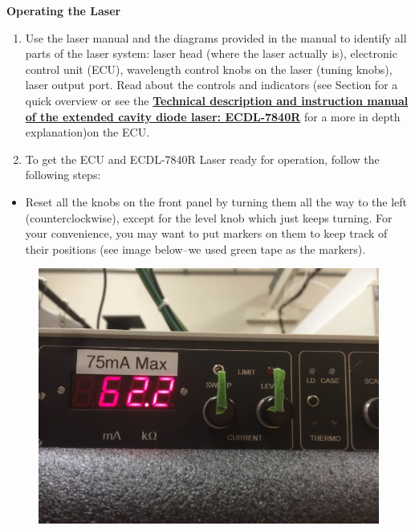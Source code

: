 \documentclass{../lab}
\begin{document}
\textbf{Operating the Laser}\begin{enumerate}
    \item Use the laser manual and the diagrams provided in the manual to identify all parts of the laser system: laser head (where the laser actually is), electronic control unit (ECU), wavelength control knobs on the laser (tuning knobs), laser output port. Read about the controls and indicators (see Section  for a quick overview or see the \href{http://physics111.lib.berkeley.edu/Physics111/Equipment\_Manuals/manual\_D1\_ECDL\_laser.pdf}{\textbf{Technical description and instruction manual of the extended cavity diode laser: ECDL-7840R}} for a more in depth explanation)on the ECU.

    \item To get the ECU and ECDL-7840R Laser ready for operation, follow the following steps:

\end{enumerate}

\begin{itemize}
    \item Reset all the knobs on the front panel by turning them all the way to the left (counterclockwise), except for the level knob which just keeps turning. For your convenience, you may want to put markers on them to keep track of their positions (see image below--we used green tape as the markers).

\end{itemize}


\begin{figure}[h]
    \centering
    \href{http://dev-physicsadv.pantheon.berkeley.edu/sites/default/files/MNO_pics/800px-ECUknobs.jpg}{\includegraphics[width=0.5\linewidth]{images/800px-ECUknobs.jpg}}
    \caption{}
    \label{fig:800px-ECUknobs}
\end{figure}
\end{document}
